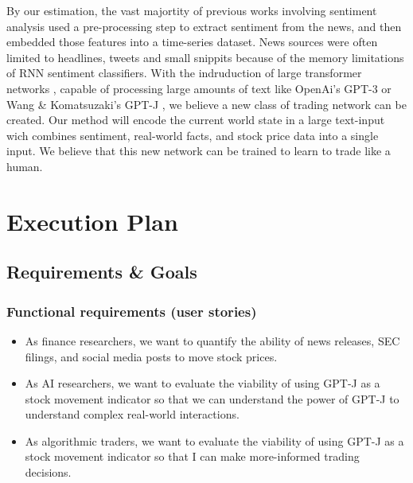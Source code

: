 \documentclass[conference]{IEEEtran}
\begin{document}
By our estimation, the vast majortity of previous works involving sentiment analysis used a pre-processing step to extract sentiment from the news, and then embedded those features into a time-series dataset. News sources were often limited to headlines, tweets and small snippits because of the memory limitations of RNN sentiment classifiers. With the indruduction of large transformer networks \cite{Vaswani2017}, capable of processing large amounts of text like OpenAi's GPT-3 \cite{Brown2020} or Wang \& Komatsuzaki's GPT-J \cite{gpt-j}, we believe a new class of trading network can be created. Our method will encode the current world state in a large text-input wich combines sentiment, real-world facts, and stock price data into a single input. We believe that this new network can be trained to learn to trade like a human.

\section{Execution Plan}
\subsection{Requirements \& Goals}
\subsubsection{Functional requirements (user stories)}
\begin{itemize}
\item As finance researchers, we want to quantify the ability of news releases, SEC filings, and social media posts to move stock prices.
\item As AI researchers, we want to evaluate the viability of using GPT-J as a stock movement indicator so that we can understand the power of GPT-J to understand complex real-world interactions.
\item As algorithmic traders, we want to evaluate the viability of using GPT-J as a stock movement indicator so that I can make more-informed trading decisions.
\end{itemize}
\end{document}
